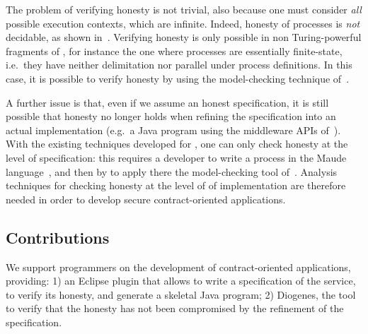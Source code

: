 %
The problem of verifying honesty is not trivial, 
also because one must consider \emph{all} possible execution contexts, 
which are infinite. %
Indeed, honesty of \coco processes is \emph{not} decidable, as shown 
in~\cite{Bartoletti15wsfm}. %
Verifying honesty is only possible in non Turing-powerful fragments of \coco,
for instance the one where processes are essentially finite-state,
i.e.\ they have neither delimitation nor parallel under process definitions. %
In this case, it is possible to verify honesty 
by using the model-checking technique of~\cite{verifiable}. %

A further issue is that, 
even if we assume an honest \coco specification, 
it is still possible that honesty no longer holds 
when refining the specification into an actual implementation 
(e.g.\ a Java program using the middleware APIs of~\cite{CO2middleware}). %
%
With the existing techniques developed for \coco, 
one can only check honesty at the level of specification:
this requires a developer to
write a \coco process in the Maude language~\cite{Maude01},
and then by to apply there the model-checking tool of~\cite{verifiable}. %
Analysis techniques for checking honesty at the level of of implementation
are therefore needed in order to develop secure contract-oriented applications.

\subsection*{Contributions}

We support programmers on the development of contract-oriented 
applications, providing:
1) an Eclipse plugin that allows to write a \coco specification of the service,
to verify its honesty, and generate a skeletal Java program;
2) Diogenes, the tool to verify that the honesty has not been compromised
by the refinement of the specification.

